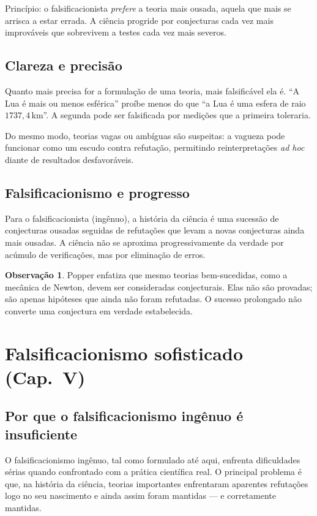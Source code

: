 \documentclass[9pt,a4paper]{extarticle}
\newcommand{\impt}[1]{\textcolor{important}{#1}}
\newcommand{\ntc}[1]{\textcolor{notice}{#1}}
\theoremstyle{definition}
\newtheorem{remark}{Observação}[section]
\begin{document}
\ntc{Princípio:} o falsificacionista \emph{prefere} a teoria mais ousada, aquela que mais se arrisca a estar errada. A ciência progride por conjecturas cada vez mais improváveis que sobrevivem a testes cada vez mais severos.

\subsection{Clareza e precisão}

Quanto mais \impt{precisa} for a formulação de uma teoria, mais falsificável ela é. ``A Lua é mais ou menos esférica'' proíbe menos do que ``a Lua é uma esfera de raio $1737{,}4$\,km''. A segunda pode ser falsificada por medições que a primeira toleraria.

Do mesmo modo, teorias vagas ou ambíguas são suspeitas: a vagueza pode funcionar como um \impt{escudo contra refutação}, permitindo reinterpretações \emph{ad hoc} diante de resultados desfavoráveis.

\subsection{Falsificacionismo e progresso}

Para o falsificacionista (ingênuo), a história da ciência é uma sucessão de \impt{conjecturas ousadas} seguidas de \impt{refutações} que levam a novas conjecturas ainda mais ousadas. A ciência não se aproxima progressivamente da verdade por acúmulo de verificações, mas por eliminação de erros.

\begin{remark}
Popper enfatiza que mesmo teorias bem-sucedidas, como a mecânica de Newton, devem ser consideradas \impt{conjecturais}. Elas não são provadas; são apenas hipóteses que ainda não foram refutadas. O sucesso prolongado não converte uma conjectura em verdade estabelecida.
\end{remark}

\section{Falsificacionismo sofisticado (Cap.~V)}

\subsection{Por que o falsificacionismo ingênuo é insuficiente}

O falsificacionismo ingênuo, tal como formulado até aqui, enfrenta dificuldades sérias quando confrontado com a prática científica real. O principal problema é que, na história da ciência, \impt{teorias importantes enfrentaram aparentes refutações logo no seu nascimento} e ainda assim foram mantidas --- e corretamente mantidas.
\end{document}
